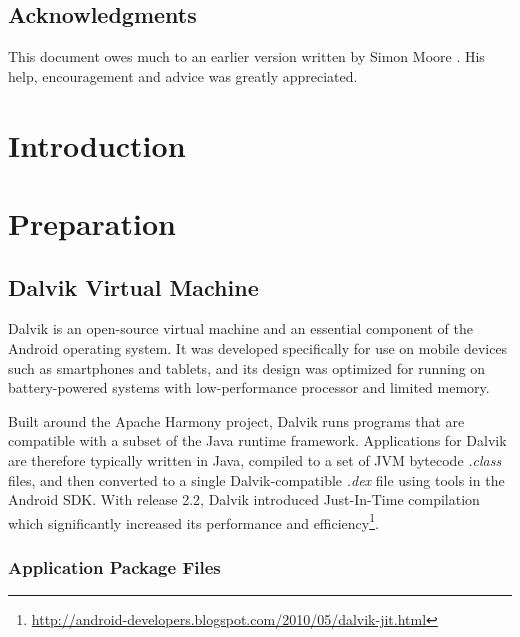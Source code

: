 \documentclass[12pt,twoside,notitlepage]{report}
\begin{document}
\newpage
\section*{Acknowledgments}

This document owes much to an earlier version written by Simon Moore
\cite{moore95}.  His help, encouragement and advice was greatly 
appreciated.


\cleardoublepage        %

\setcounter{page}{1}
\pagestyle{headings}

\chapter{Introduction}


\cleardoublepage
\chapter{Preparation}

\section{Dalvik Virtual Machine}

Dalvik is an open-source virtual machine and an essential component of the Android operating system. It was developed specifically for use on mobile devices such as smartphones and tablets, and its design was optimized for running on battery-powered systems with low-performance processor and limited memory. 

Built around the Apache Harmony project, Dalvik runs programs that are compatible with a subset of the Java runtime framework. Applications for Dalvik are therefore typically written in Java, compiled to a set of JVM bytecode \emph{.class} files, and then converted to a single Dalvik-compatible \emph{.dex} file using tools in the Android SDK. With release 2.2, Dalvik introduced Just-In-Time compilation which significantly increased its performance and efficiency\footnote{\url{http://android-developers.blogspot.com/2010/05/dalvik-jit.html}}.

\subsection{Application Package Files}
\end{document}
